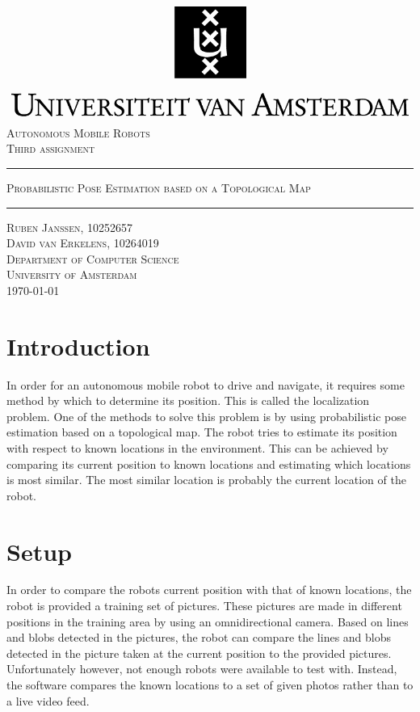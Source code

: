 \documentclass[12pt]{article}
\begin{document}
\begin{titlepage}
\begin{center}
    \includegraphics[width=\textwidth]{./logo.png}
    \\ [2.5cm]
    \textsc{\Large Autonomous Mobile Robots}
    \\ [0.5cm]
    \textsc{\large Third assignment}
    \\ [1cm]
    \hrule
    \vspace{0.3cm}
    \textsc{Probabilistic Pose Estimation based on a Topological Map}
    \\ [0.3cm]
    \hrule
    \vfill
    \textsc{Ruben Janssen, 10252657 \\[0.2cm] David van Erkelens, 10264019 \\[0.7cm] Department of Computer Science \\ University of Amsterdam \\[0.3cm] \today}
\end{center}
\end{titlepage}
\tableofcontents
\clearpage
\section{Introduction}
In order for an autonomous mobile robot to drive and navigate, it requires some method by which to determine its position. This is called the localization problem. One of the methods to solve this problem is by using probabilistic pose estimation based on a topological map. The robot tries to estimate its position with respect to known locations in the environment. This can be achieved by comparing its current position to known locations and estimating which locations is most similar. The most similar location is probably the current location of the robot.

\section{Setup}
In order to compare the robots current position with that of known locations, the robot is provided a training set of pictures. These pictures are made in different positions in the training area by using an omnidirectional camera. Based on lines and blobs detected in the pictures, the robot can compare the lines and blobs detected in the picture taken at the current position to the provided pictures. Unfortunately however, not enough robots were available to test with. Instead, the software compares the known locations to a set of given photos rather than to a live video feed.
\end{document}
